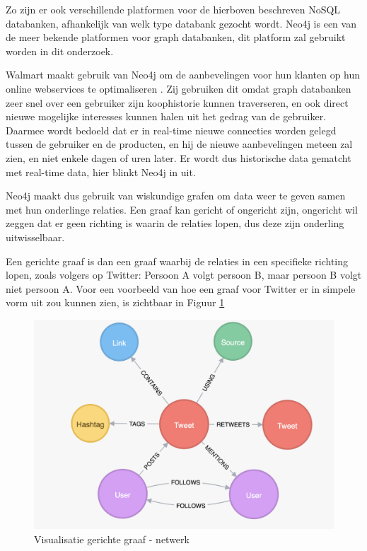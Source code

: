 Zo zijn er ook verschillende platformen voor de hierboven beschreven NoSQL databanken, afhankelijk van welk type databank gezocht wordt. Neo4j is een van de meer bekende platformen voor graph databanken, dit platform zal gebruikt worden in dit onderzoek.

Walmart maakt gebruik van Neo4j om de aanbevelingen voor hun klanten op hun online webservices te optimaliseren \autocite{neo4jWalmart2014}. Zij gebruiken dit omdat graph databanken zeer snel over een gebruiker zijn koophistorie kunnen traverseren, en ook direct nieuwe mogelijke interesses kunnen halen uit het gedrag van de gebruiker. Daarmee wordt bedoeld dat er in real-time nieuwe connecties worden gelegd tussen de gebruiker en de producten, en hij de nieuwe aanbevelingen meteen zal zien, en niet enkele dagen of uren later. Er wordt dus historische data gematcht met real-time data, hier blinkt Neo4j in uit. 

Neo4j maakt dus gebruik van wiskundige grafen om data weer te geven samen met hun onderlinge relaties. Een graaf kan gericht of ongericht zijn, ongericht wil zeggen dat er geen richting is waarin de relaties lopen, dus deze zijn onderling uitwisselbaar. 

Een gerichte graaf is dan een graaf waarbij de relaties in een specifieke richting lopen, zoals volgers op Twitter: Persoon A volgt persoon B, maar persoon B volgt niet persoon A. Voor een voorbeeld van hoe een graaf voor Twitter er in simpele vorm uit zou kunnen zien, is zichtbaar in Figuur \ref{fig:TwitterGraphExample}

\begin{figure} [hbt!]
	\centering
	\includegraphics[width=\linewidth]{img/twitter_graph}
	\caption[Visualisatie gerichte graaf - netwerk]{Visualisatie gerichte graaf - netwerk}
	\label{fig:TwitterGraphExample}
\end{figure}

